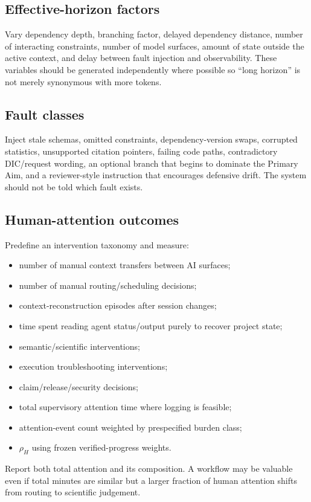 \documentclass[11pt,a4paper]{article}
\begin{document}
\subsection{Effective-horizon factors}
Vary dependency depth, branching factor, delayed dependency distance, number of interacting constraints, number of model surfaces, amount of state outside the active context, and delay between fault injection and observability. These variables should be generated independently where possible so ``long horizon'' is not merely synonymous with more tokens.

\subsection{Fault classes}
Inject stale schemas, omitted constraints, dependency-version swaps, corrupted statistics, unsupported citation pointers, failing code paths, contradictory DIC/request wording, an optional branch that begins to dominate the Primary Aim, and a reviewer-style instruction that encourages defensive drift. The system should not be told which fault exists.

\subsection{Human-attention outcomes}
Predefine an intervention taxonomy and measure:
\begin{itemize}
\item number of manual context transfers between AI surfaces;
\item number of manual routing/scheduling decisions;
\item context-reconstruction episodes after session changes;
\item time spent reading agent status/output purely to recover project state;
\item semantic/scientific interventions;
\item execution troubleshooting interventions;
\item claim/release/security decisions;
\item total supervisory attention time where logging is feasible;
\item attention-event count weighted by prespecified burden class;
\item $\rho_H$ using frozen verified-progress weights.
\end{itemize}
Report both total attention and its composition. A workflow may be valuable even if total minutes are similar but a larger fraction of human attention shifts from routing to scientific judgement.
\end{document}
